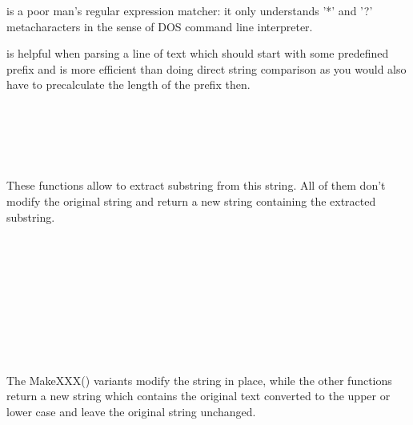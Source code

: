  is a poor man's regular expression matcher:
it only understands '*' and '?' metacharacters in the sense of DOS command line
interpreter.

 is helpful when parsing a line of
text which should start with some predefined prefix and is more efficient than
doing direct string comparison as you would also have to precalculate the
length of the prefix then.

\\
\\
\\
\\


These functions allow to extract substring from this string. All of them don't
modify the original string and return a new string containing the extracted
substring.

\\
\\
\\
\\
\\
\\
\\
\\


The MakeXXX() variants modify the string in place, while the other functions
return a new string which contains the original text converted to the upper or
lower case and leave the original string unchanged.

\\
\\
\\


